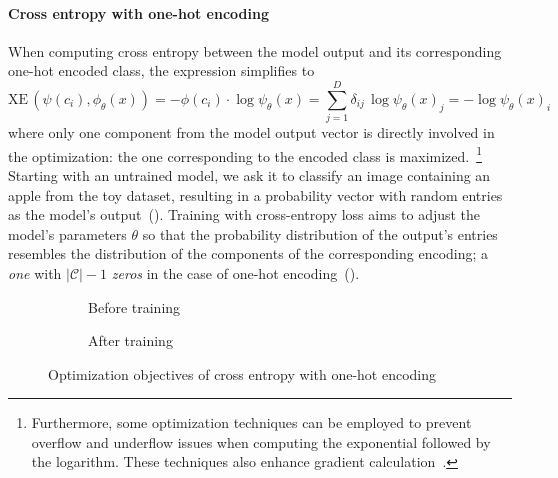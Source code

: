 \paragraph{Cross entropy with one-hot encoding} When computing cross entropy between the model output and its corresponding one-hot encoded class, the expression simplifies to
\begin{equation*}
  \textrm{XE} \, (\psi(c_i),\phi_\theta(x))
  = - \phi(c_i) \cdot \log \psi_\theta(x)
  = \sum_{j = 1}^D \delta_{ij} \, \log \psi_\theta(x)_j
  = - \log \psi_\theta(x)_i
  \label{eq:cross-entropy-one-hot-encoding}
\end{equation*}
where only one component from the model output vector is directly involved in the optimization: the one corresponding to the encoded class is maximized.~\footnote{Furthermore, some optimization techniques can be employed to prevent overflow and underflow issues when computing the exponential followed by the logarithm. These techniques also enhance gradient calculation~\cite{SoftmaxWithCrPeters2017, UnderstandingSMirand2017, DeepLearningGoodfe2016}.}
Starting with an untrained model, we ask it to classify an image containing an apple from the toy dataset, resulting in a probability vector with random entries as the model's output~(). Training with cross-entropy loss aims to adjust the model's parameters $\theta$ so that the probability distribution of the output's entries resembles the distribution of the components of the corresponding encoding; a \emph{one} with $|\mathcal{C}| - 1$ \emph{zeros} in the case of one-hot encoding~().
\begin{figure}[htbp]
  \centering
  \begin{subfigure}{0.45\textwidth}
    \centering
    \begin{minipage}{\textwidth}
      \resizebox{\linewidth}{!}{}
    \end{minipage}
    \caption{Before training}
    \label{fig:03/xe-onehot-before}
  \end{subfigure}
  \begin{subfigure}{0.45\textwidth}
    \centering
    \begin{minipage}{\textwidth}
      \resizebox{\linewidth}{!}{}
    \end{minipage}
    \caption{After training}
    \label{fig:03/xe-onehot-after}
  \end{subfigure}
  \caption{Optimization objectives of cross entropy with one-hot encoding}
\end{figure}

